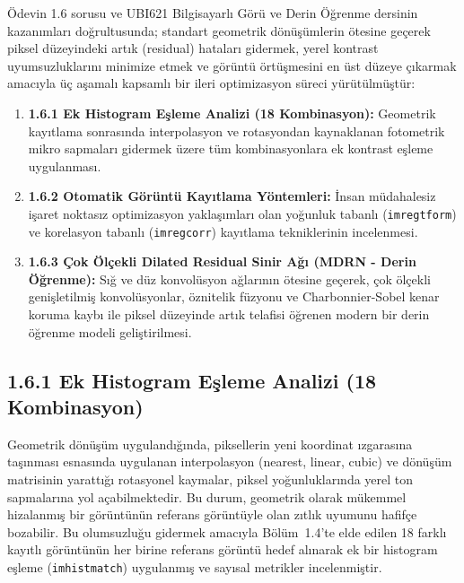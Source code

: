 \documentclass[12pt,a4paper]{article}
\begin{document}
Ödevin 1.6 sorusu ve UBI621 Bilgisayarlı Görü ve Derin Öğrenme dersinin kazanımları doğrultusunda; standart geometrik dönüşümlerin ötesine geçerek piksel düzeyindeki artık (residual) hataları gidermek, yerel kontrast uyumsuzluklarını minimize etmek ve görüntü örtüşmesini en üst düzeye çıkarmak amacıyla üç aşamalı kapsamlı bir ileri optimizasyon süreci yürütülmüştür:
\begin{enumerate}
    \item \textbf{1.6.1 Ek Histogram Eşleme Analizi (18 Kombinasyon):} Geometrik kayıtlama sonrasında interpolasyon ve rotasyondan kaynaklanan fotometrik mikro sapmaları gidermek üzere tüm kombinasyonlara ek kontrast eşleme uygulanması.
    \item \textbf{1.6.2 Otomatik Görüntü Kayıtlama Yöntemleri:} İnsan müdahalesiz işaret noktasız optimizasyon yaklaşımları olan yoğunluk tabanlı (\texttt{imregtform}) ve korelasyon tabanlı (\texttt{imregcorr}) kayıtlama tekniklerinin incelenmesi.
    \item \textbf{1.6.3 Çok Ölçekli Dilated Residual Sinir Ağı (MDRN - Derin Öğrenme):} Sığ ve düz konvolüsyon ağlarının ötesine geçerek, çok ölçekli genişletilmiş konvolüsyonlar, öznitelik füzyonu ve Charbonnier-Sobel kenar koruma kaybı ile piksel düzeyinde artık telafisi öğrenen modern bir derin öğrenme modeli geliştirilmesi.
\end{enumerate}

\subsection{1.6.1 Ek Histogram Eşleme Analizi (18 Kombinasyon)}
Geometrik dönüşüm uygulandığında, piksellerin yeni koordinat ızgarasına taşınması esnasında uygulanan interpolasyon (nearest, linear, cubic) ve dönüşüm matrisinin yarattığı rotasyonel kaymalar, piksel yoğunluklarında yerel ton sapmalarına yol açabilmektedir. Bu durum, geometrik olarak mükemmel hizalanmış bir görüntünün referans görüntüyle olan zıtlık uyumunu hafifçe bozabilir. Bu olumsuzluğu gidermek amacıyla Bölüm~1.4'te elde edilen 18 farklı kayıtlı görüntünün her birine referans görüntü hedef alınarak ek bir histogram eşleme (\texttt{imhistmatch}) uygulanmış ve sayısal metrikler incelenmiştir.
\end{document}
